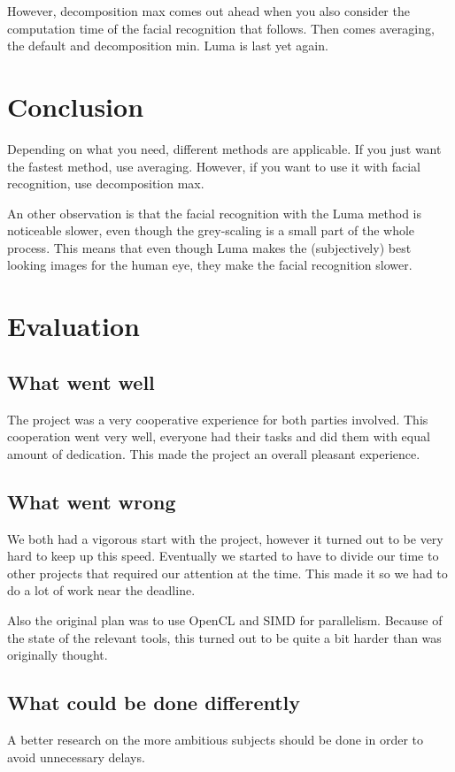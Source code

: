 \documentclass[a4paper]{article}
\begin{document}
However, decomposition max comes out ahead when you also consider the computation time of the facial recognition that follows. Then comes averaging, the default and decomposition min. Luma is last yet again.

\section{Conclusion}
Depending on what you need, different methods are applicable. If you just want the fastest method, use averaging. However, if you want to use it with facial recognition, use decomposition max.

An other observation is that the facial recognition with the Luma method is noticeable slower, even though the grey-scaling is a small part of the whole process. This means that even though Luma makes the (subjectively) best looking images for the human eye, they make the facial recognition slower.

\section{Evaluation}
\subsection{What went well}
The project was a very cooperative experience for both parties involved. This cooperation went very well, everyone had their tasks and did them with equal amount of dedication. This made the project an overall pleasant experience.
\subsection{What went wrong}
We both had a vigorous start with the project, however it turned out to be very hard to keep up this speed. Eventually we started to have to divide our time to other projects that required our attention at the time. This made it so we had to do a lot of work near the deadline.

Also the original plan was to use OpenCL and SIMD for parallelism. Because of the state of the relevant tools, this turned out to be quite a bit harder than was originally thought.
\subsection{What could be done differently}
A better research on the more ambitious subjects should be done in order to avoid unnecessary delays.

\begin{thebibliography}{9}
\end{thebibliography}
\end{document}
